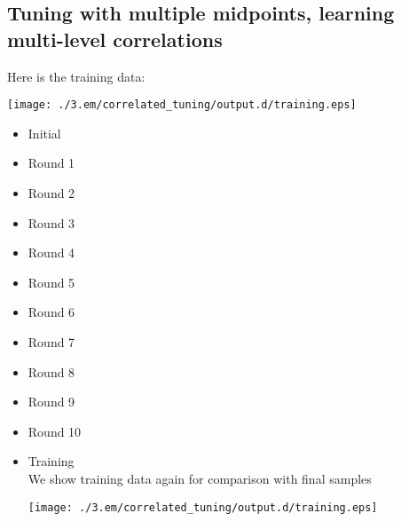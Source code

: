 \documentclass{book}
\begin{document}
\subsection{Tuning with multiple midpoints, learning multi-level correlations}
\label{sec-3_4_3}


Here is the training data:

\texttt{[image: ./3.em/correlated\_tuning/output.d/training.eps]}
\begin{itemize}

\item Initial\\
\label{sec-3_4_3_1}%



\item Round 1\\
\label{sec-3_4_3_2}%


\item Round 2\\
\label{sec-3_4_3_3}%


\item Round 3\\
\label{sec-3_4_3_4}%


\item Round 4\\
\label{sec-3_4_3_5}%


\item Round 5\\
\label{sec-3_4_3_6}%


\item Round 6\\
\label{sec-3_4_3_7}%


\item Round 7\\
\label{sec-3_4_3_8}%


\item Round 8\\
\label{sec-3_4_3_9}%


\item Round 9\\
\label{sec-3_4_3_10}%


\item Round 10\\
\label{sec-3_4_3_11}%



\item Training\\
\label{sec-3_4_3_12}%
We show training data again for comparison with final samples
 
\texttt{[image: ./3.em/correlated\_tuning/output.d/training.eps]}

\end{itemize} %
\end{document}
